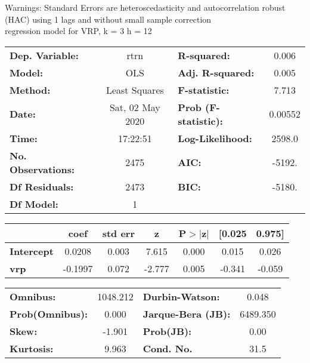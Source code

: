 Warnings: \newline
 [1] Standard Errors are heteroscedasticity and autocorrelation robust (HAC) using 1 lags and without small sample correction\\ 

regression model for VRP, k = 3 h = 12\begin{center}
\begin{tabular}{lclc}
\toprule
\textbf{Dep. Variable:}    &       rtrn       & \textbf{  R-squared:         } &     0.006   \\
\textbf{Model:}            &       OLS        & \textbf{  Adj. R-squared:    } &     0.005   \\
\textbf{Method:}           &  Least Squares   & \textbf{  F-statistic:       } &     7.713   \\
\textbf{Date:}             & Sat, 02 May 2020 & \textbf{  Prob (F-statistic):} &  0.00552    \\
\textbf{Time:}             &     17:22:51     & \textbf{  Log-Likelihood:    } &    2598.0   \\
\textbf{No. Observations:} &        2475      & \textbf{  AIC:               } &    -5192.   \\
\textbf{Df Residuals:}     &        2473      & \textbf{  BIC:               } &    -5180.   \\
\textbf{Df Model:}         &           1      & \textbf{                     } &             \\
\bottomrule
\end{tabular}
\begin{tabular}{lcccccc}
                   & \textbf{coef} & \textbf{std err} & \textbf{z} & \textbf{P$> |$z$|$} & \textbf{[0.025} & \textbf{0.975]}  \\
\midrule
\textbf{Intercept} &       0.0208  &        0.003     &     7.615  &         0.000        &        0.015    &        0.026     \\
\textbf{vrp}       &      -0.1997  &        0.072     &    -2.777  &         0.005        &       -0.341    &       -0.059     \\
\bottomrule
\end{tabular}
\begin{tabular}{lclc}
\textbf{Omnibus:}       & 1048.212 & \textbf{  Durbin-Watson:     } &    0.048  \\
\textbf{Prob(Omnibus):} &   0.000  & \textbf{  Jarque-Bera (JB):  } & 6489.350  \\
\textbf{Skew:}          &  -1.901  & \textbf{  Prob(JB):          } &     0.00  \\
\textbf{Kurtosis:}      &   9.963  & \textbf{  Cond. No.          } &     31.5  \\
\bottomrule
\end{tabular}
\end{center}

